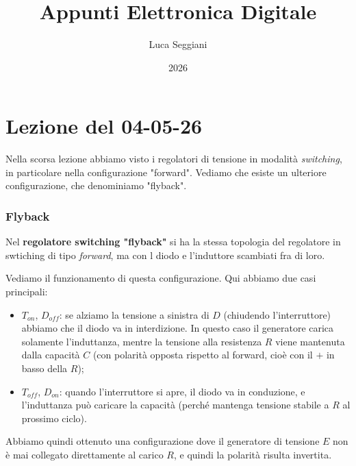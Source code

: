 \documentclass[a4paper,11pt]{article}
\title{Appunti Elettronica Digitale}
\author{Luca Seggiani}
\date{2026}
\begin{document}
\section{Lezione del 04-05-26}

\thispagestyle{empty}
\pagestyle{fancy}

Nella scorsa lezione abbiamo visto i regolatori di tensione in modalità \textit{switching}, in particolare nella configurazione "forward". Vediamo che esiste un ulteriore configurazione, che denominiamo "flyback".

\subsubsection{Flyback}
Nel \textbf{regolatore switching "flyback"} si ha la stessa topologia del regolatore in swtiching di tipo \textit{forward}, ma con l diodo e l'induttore scambiati fra di loro.

\begin{center}
\end{center}

Vediamo il funzionamento di questa configurazione. Qui abbiamo due casi principali:
\begin{itemize}
	\item $T_{on}$, $D_{off}$: se alziamo la tensione a sinistra di $D$ (chiudendo l'interruttore) abbiamo che il diodo va in interdizione. In questo caso il generatore carica solamente l'induttanza, mentre la tensione alla resistenza $R$ viene mantenuta dalla capacità $C$ (con polarità opposta rispetto al forward, cioè con il $+$ in basso della $R$);
	\item $T_{off}$, $D_{on}$: quando l'interruttore si apre, il diodo va in conduzione, e l'induttanza può caricare la capacità (perché mantenga tensione stabile a $R$ al prossimo ciclo). 
\end{itemize}

Abbiamo quindi ottenuto una configurazione dove il generatore di tensione $E$ non è mai collegato direttamente al carico $R$, e quindi la polarità risulta invertita.
\end{document}
